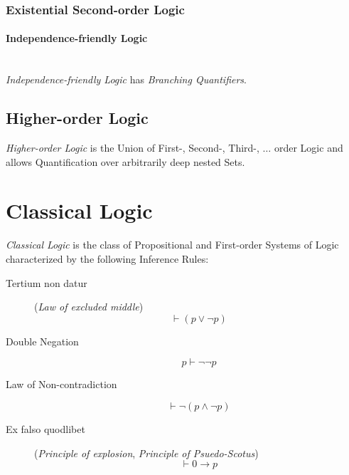 \subsubsection{Existential Second-order Logic}
\label{sec:existential_secondorder}

\paragraph{Independence-friendly
  Logic}\label{sec:independence_logic}\hfill \\

\emph{Independence-friendly Logic} has \emph{Branching Quantifiers}.



\subsection{Higher-order Logic}\label{sec:higherorder_logic}

\emph{Higher-order Logic} is the Union of First-, Second-, Third-,
$\ldots$ order Logic and allows Quantification over arbitrarily deep
nested Sets.



\section{Classical Logic}\label{sec:classical_logic}

\emph{Classical Logic} is the class of Propositional and
First-order Systems of Logic characterized by the following Inference
Rules:

\begin{description}

\item [Tertium non datur] (\emph{Law of excluded middle})
    \[\vdash(p \vee \neg p)\]

\item [Double Negation]
    \[p \vdash \neg\neg p\]

\item [Law of Non-contradiction]
    \[\vdash \neg(p \wedge \neg p)\]

\item [Ex falso quodlibet] (\emph{Principle of explosion},
  \emph{Principle of Psuedo-Scotus})
    \[\vdash 0 \rightarrow p\]


\end{description}

